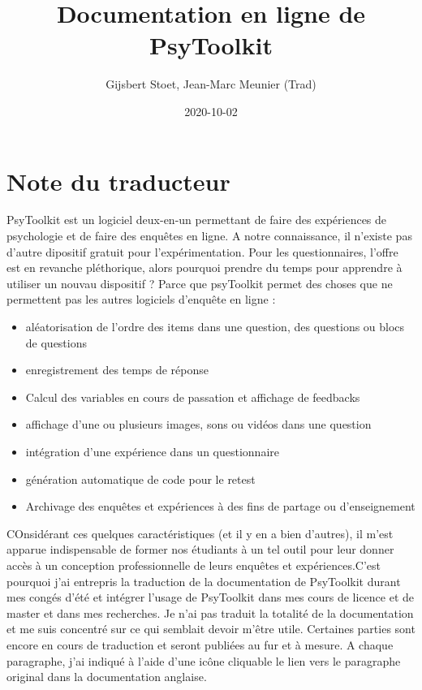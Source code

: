 \documentclass[
]{book}
\title{Documentation en ligne de PsyToolkit}
\author{Gijsbert Stoet, Jean-Marc Meunier (Trad)}
\date{2020-10-02}
\providecommand{\tightlist}{%
  \setlength{\itemsep}{0pt}\setlength{\parskip}{0pt}}
\begin{document}
\frontmatter
\maketitle

\mainmatter
\hypertarget{note-du-traducteur}{%
\chapter*{Note du traducteur}\label{note-du-traducteur}}

PsyToolkit est un logiciel deux-en-un permettant de faire des
expériences de psychologie et de faire des enquêtes en ligne. A notre
connaissance, il n'existe pas d'autre dipositif gratuit pour
l'expérimentation. Pour les questionnaires, l'offre est en revanche
pléthorique, alors pourquoi prendre du temps pour apprendre à utiliser
un nouvau dispositif ? Parce que psyToolkit permet des choses que ne
permettent pas les autres logiciels d'enquête en ligne :

\begin{itemize}
\tightlist
\item
  aléatorisation de l'ordre des items dans une question, des questions
  ou blocs de questions
\item
  enregistrement des temps de réponse
\item
  Calcul des variables en cours de passation et affichage de feedbacks
\item
  affichage d'une ou plusieurs images, sons ou vidéos dans une question
\item
  intégration d'une expérience dans un questionnaire
\item
  génération automatique de code pour le retest
\item
  Archivage des enquêtes et expériences à des fins de partage ou
  d'enseignement
\end{itemize}

COnsidérant ces quelques caractéristiques (et il y en a bien d'autres),
il m'est apparue indispensable de former nos étudiants à un tel outil
pour leur donner accès à un conception professionnelle de leurs enquêtes
et expériences.C'est pourquoi j'ai entrepris la traduction de la
documentation de PsyToolkit durant mes congés d'été et intégrer l'usage
de PsyToolkit dans mes cours de licence et de master et dans mes
recherches. Je n'ai pas traduit la totalité de la documentation et me
suis concentré sur ce qui semblait devoir m'être utile. Certaines
parties sont encore en cours de traduction et seront publiées au fur et
à mesure. A chaque paragraphe, j'ai indiqué à l'aide d'une icône
cliquable le lien vers le paragraphe original dans la documentation
anglaise.
\end{document}
